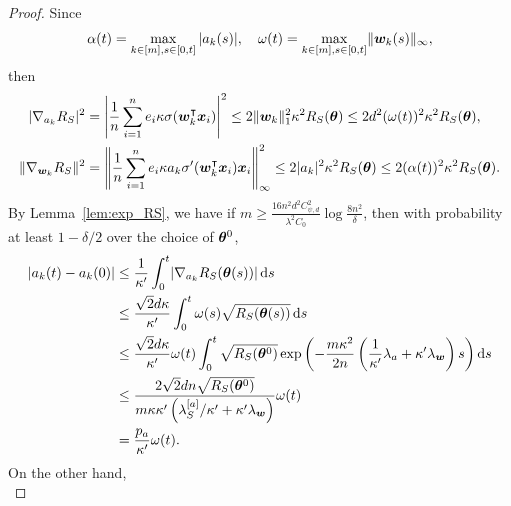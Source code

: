 \documentclass{article}
\begin{document}
\begin{proof}
    Since
    \begin{equation*}
        \alpha(t)=\max\limits_{k\in[m],s\in[0,t]}|a_k(s)|, \quad \omega(t)=\max\limits_{k\in[m],s\in[0,t]}\lVert\bm{w}_k(s)\rVert_{\infty},
    \end{equation*}
    then
    \begin{equation*}
        \begin{aligned}
            \lvert\nabla_{a_k}R_S\rvert^2    & =\left\lvert\frac{1}{n}\sum_{i=1}^n e_i\kappa\sigma(\bm{w}_k^\intercal\bm{x}_i)\right\rvert^2\leq 2\lVert\bm{w}_k\rVert^2_1\kappa^2R_S(\bm{\theta})\leq 2d^2(\omega(t))^2\kappa^2R_S(\bm{\theta}),            \\
            \lVert\nabla_{\bm{w}_k}R_S\rVert^2 & =\left\lVert\frac{1}{n}\sum_{i=1}^n e_i\kappa a_k\sigma'(\bm{w}_k^\intercal\bm{x}_i)\bm{x}_i\right\rVert^2_{\infty}\leq 2\lvert a_k\rvert^2\kappa^2R_S(\bm{\theta})\leq 2(\alpha(t))^2\kappa^2R_S(\bm{\theta}).
        \end{aligned}
    \end{equation*}
    By Lemma~\ref{lem:exp_RS}, we have if $m\geq \frac{16n^2d^2C_{\psi,d}^2}{\lambda^2C_0}\log\frac{8n^2}{\delta}$, then with probability at least $1 - \delta/2$ over the choice of $\bm{\theta}^0$,
    \begin{equation*}
        \begin{aligned}
            \lvert a_k(t) - a_k(0)\rvert
             & \leq\frac{1}{\kappa'}\int_0^t\lvert\nabla_{a_k}R_S(\bm{\theta}(s))\rvert\mathop{}\!\mathrm{d}{s}                                                                                                                   \\
             & \leq\frac{\sqrt{2}d\kappa}{\kappa'}\int_{0}^{t} \omega(s)\sqrt{R_S(\bm{\theta}(s))}\mathop{}\!\mathrm{d}{s}                                                                                                  \\
             & \leq\frac{\sqrt{2}d\kappa}{\kappa'}\omega(t)\int_{0}^{t}\sqrt{R_S(\bm{\theta}^0)}\exp\left(-\frac{m\kappa^2}{2n}\left(\frac{1}{\kappa'}\lambda_a+\kappa'\lambda_{\bm{w}}\right)s\right)\mathop{}\!\mathrm{d}{s} \\
             & \leq \frac{2\sqrt{2}dn\sqrt{R_S(\bm{\theta}^0)}}{m\kappa\kappa'\left(\lambda^{[a]}_S/\kappa'+\kappa'\lambda_{\bm{w}}\right)}\omega(t)                                                           \\
             & =\frac{p_a}{\kappa'}\omega(t).
        \end{aligned}
    \end{equation*}
    On the other hand,
    \begin{equation*}

\end{equation*}
\end{proof}
\end{document}
